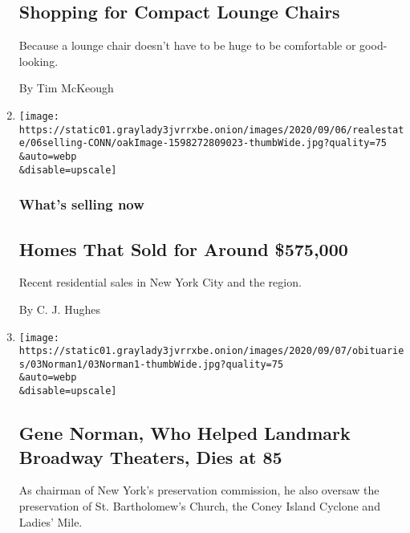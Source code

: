 \begin{enumerate}
  \hypertarget{shopping-for-compact-lounge-chairs}{%
  \subsection{Shopping for Compact Lounge
  Chairs}\label{shopping-for-compact-lounge-chairs}}

  Because a lounge chair doesn't have to be huge to be comfortable or
  good-looking.

  By Tim McKeough
\item
  \href{/2020/09/06/realestate/homes-that-sold-for-around-575000.html}{}

  \texttt{[image: https://static01.graylady3jvrrxbe.onion/images/2020/09/06/realestate/06selling-CONN/oakImage-1598272809023-thumbWide.jpg?quality=75\\\&auto=webp\\\&disable=upscale]}

  \hypertarget{whats-selling-now}{%
  \subsubsection{What's selling now}\label{whats-selling-now}}

  \hypertarget{homes-that-sold-for-around-575000}{%
  \subsection{Homes That Sold for Around
  \$575,000}\label{homes-that-sold-for-around-575000}}

  Recent residential sales in New York City and the region.

  By C. J. Hughes
\item
  \href{/2020/09/05/nyregion/gene-norman-dead.html}{}

  \texttt{[image: https://static01.graylady3jvrrxbe.onion/images/2020/09/07/obituaries/03Norman1/03Norman1-thumbWide.jpg?quality=75\\\&auto=webp\\\&disable=upscale]}

  \hypertarget{gene-norman-who-helped-landmark-broadway-theaters-dies-at-85}{%
  \subsection{Gene Norman, Who Helped Landmark Broadway Theaters, Dies
  at
  85}\label{gene-norman-who-helped-landmark-broadway-theaters-dies-at-85}}

  As chairman of New York's preservation commission, he also oversaw the
  preservation of St. Bartholomew's Church, the Coney Island Cyclone and
  Ladies' Mile.


\end{enumerate}
